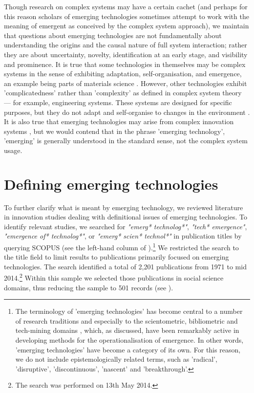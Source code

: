 \documentclass[11pt]{article}
\begin{document}
Though research on complex systems may have a certain cachet (and perhaps for this reason scholars of emerging technologies sometimes attempt to work with the meaning of emergent as conceived by the complex system approach), we maintain that questions about emerging technologies are not fundamentally about understanding the origins and the causal nature of full system interaction; rather they are about uncertainty, novelty, identification at an early stage, and visibility and prominence. It is true that some technologies in themselves may be complex systems in the sense of exhibiting adaptation, self-organisation, and emergence, an example being parts of materials science \citep{Ivanova1998}. However, other technologies exhibit 'complicatedness' rather than 'complexity' as defined in complex system theory --- for example, engineering systems. These systems are designed for specific purposes, but they do not adapt and self-organise to changes in the environment \citep{Ottino2004}. It is also true that emerging technologies may arise from complex innovation systems \citep{Katz2006}, but we would contend that in the phrase 'emerging technology', 'emerging' is generally understood in the standard sense, not the complex system usage.

\section{Defining emerging technologies}
To further clarify what is meant by emerging technology, we reviewed literature in innovation studies dealing with definitional issues of emerging technologies. To identify relevant studies, we searched for \textit{"emerg* technolog*"}, \textit{"tech* emergence"}, \textit{"emergence of* technolog*"},  or  \textit{"emerg* scien* technol*"} in publication titles by querying SCOPUS (see the left-hand column of ).\footnote{The terminology of 'emerging technologies' has become central to a number of research traditions and especially to the scientometric, bibliometric and tech-mining domains \citep[cf.][]{Avila2011}, which, as discussed, have been remarkably active in developing methods for the operationalisation of emergence. In other words, 'emerging technologies' have become a category of its own. For this reason, we do not include epistemologically related terms, such as 'radical', 'disruptive', 'discontinuous', 'nascent' and 'breakthrough'.} We restricted the search to the title field to limit results to publications primarily focused on emerging technologies. The search identified a total of 2,201 publications from 1971 to mid 2014.\footnote{The search was performed on 13th May 2014.} Within this sample we selected those publications in social science domains, thus reducing the sample to 501 records (see ). 
\end{document}
